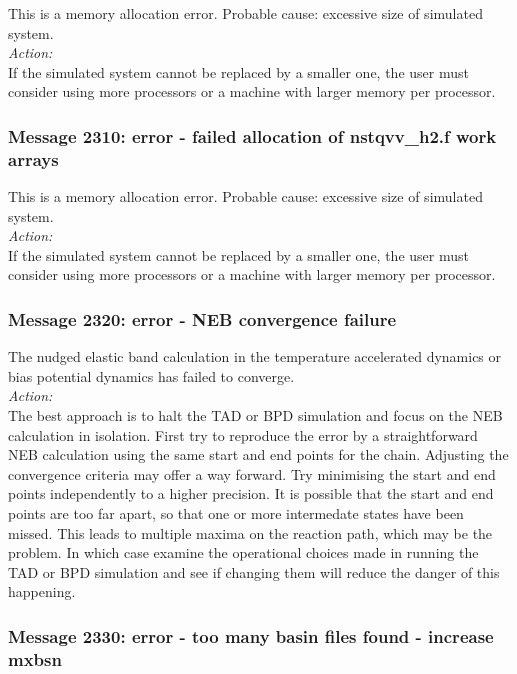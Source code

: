 This is a memory allocation error. Probable cause: excessive size of
simulated system. \\

\noindent
{\em Action:}\\
If the simulated system cannot be replaced by a smaller one, the user
must consider using more processors or a machine with larger memory
per processor.

\subsubsection*{Message 2310: error - failed allocation of nstqvv\_h2.f
work arrays}

This is a memory allocation error. Probable cause: excessive size of
simulated system. \\

\noindent
{\em Action:}\\
If the simulated system cannot be replaced by a smaller one, the user
must consider using more processors or a machine with larger memory
per processor.

\subsubsection*{Message 2320: error - NEB convergence failure}

The nudged elastic band calculation in the temperature accelerated
dynamics or bias potential dynamics has failed to converge. \\

\noindent
{\em Action:}\\ The best approach is to halt the TAD or BPD simulation
and focus on the NEB calculation in isolation. First try to reproduce
the error by a straightforward NEB calculation using the same start
and end points for the chain. Adjusting the convergence criteria may
offer a way forward. Try minimising the start and end points
independently to a higher precision. It is possible that the start and
end points are too far apart, so that one or more intermedate states
have been missed. This leads to multiple maxima on the reaction path,
which may be the problem. In which case examine the operational
choices made in running the TAD or BPD simulation and see if changing
them will reduce the danger of this happening.

\subsubsection*{Message 2330: error - too many basin files found - 
increase mxbsn}

